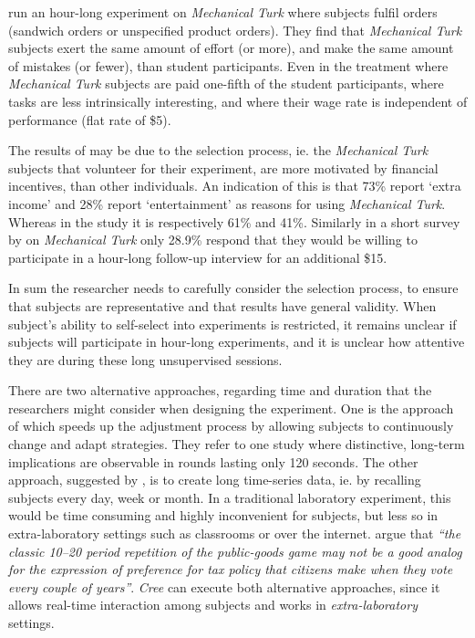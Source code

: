 \documentclass[preprint, 12pt]{elsarticle}
\newcommand{\Cree}{\emph{Cree}\xspace}
\begin{document}
\citet*{Farrell_Grenier_Leiby_2014} run an hour-long experiment on \emph{Mechanical Turk} where subjects fulfil orders (sandwich orders or unspecified product orders). They find that \emph{Mechanical Turk} subjects exert the same amount of effort (or more), and make the same amount of mistakes (or fewer), than student participants. Even in the treatment where \emph{Mechanical Turk} subjects are paid one-fifth of the student participants, where tasks are less intrinsically interesting, and where their wage rate is independent of performance (flat rate of \$5).

The results of \cite{Farrell_Grenier_Leiby_2014} may be due to the selection process, ie. the \emph{Mechanical Turk} subjects that volunteer for their experiment, are more motivated by financial incentives, than other individuals. An indication of this is that 73\% report `extra income' and 28\% report `entertainment' as reasons for using \emph{Mechanical Turk}. Whereas in the \cite{Paolacci_Chandler_Ipeirotis_2010} study it is respectively 61\% and 41\%. Similarly in a short survey by \cite{Williamson_2014} on \emph{Mechanical Turk} only 28.9\% respond that they would be willing to participate in a hour-long follow-up interview for an additional \$15.

In sum the researcher needs to carefully consider the selection process, to ensure that subjects are representative and that results have general validity. When subject's ability to self-select into experiments is restricted, it remains unclear if subjects will participate in hour-long experiments, and it is unclear how attentive they are during these long unsupervised sessions.

There are two alternative approaches, regarding time and duration that the researchers might consider when designing the experiment. One is the approach of \citet*{Pettit_Friedman_Kephart_Oprea_2014} which speeds up the adjustment process by allowing subjects to continuously change and adapt strategies. They refer to one study where distinctive, long-term implications are observable in rounds lasting only 120 seconds. The other approach, suggested by \cite{Charness_Gneezy_Kuhn_2013}, is to create long time-series data, ie. by recalling subjects every day, week or month. In a traditional laboratory experiment, this would be time consuming and highly inconvenient for subjects, but less so in extra-laboratory settings such as classrooms or over the internet. \cite[p. 96]{Charness_Gneezy_Kuhn_2013} argue that \emph{``the classic 10–20 period repetition of the public-goods game may not be a good analog for the expression of preference for tax policy that citizens make when they vote every couple of years''}. \Cree can execute both alternative approaches, since it allows real-time interaction among subjects and works in \emph{extra-laboratory} settings.
\end{document}

